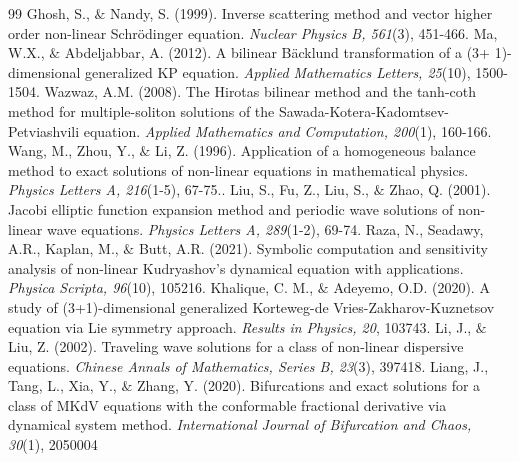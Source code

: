 \documentclass{article}
\numberwithin{equation}{section}
\begin{document}
\begin{thebibliography}{99}
 Ghosh, S., ${\&}$ Nandy, S. (1999). Inverse scattering method and vector higher order non-linear Schr\"{o}dinger equation. \emph{Nuclear Physics B, 561}(3), 451-466.
 Ma, W.X., ${\&}$ Abdeljabbar, A. (2012). A bilinear Bäcklund transformation of a (3+ 1)-dimensional generalized KP equation. \emph{Applied Mathematics Letters, 25}(10), 1500-1504.
 Wazwaz, A.M. (2008). The Hirotas bilinear method and the tanh-coth method for multiple-soliton solutions of the Sawada-Kotera-Kadomtsev-Petviashvili equation. \emph{Applied Mathematics and Computation, 200}(1), 160-166.
 Wang, M., Zhou, Y., ${\&}$ Li, Z. (1996). Application of a homogeneous balance method to exact solutions of non-linear equations in mathematical physics. \emph{Physics Letters A, 216}(1-5), 67-75..
 Liu, S., Fu, Z., Liu, S., ${\&}$ Zhao, Q. (2001). Jacobi elliptic function expansion method and periodic wave solutions of non-linear wave equations. \emph{Physics Letters A, 289}(1-2), 69-74.
 Raza, N., Seadawy, A.R., Kaplan, M., ${\&}$ Butt, A.R. (2021). Symbolic computation and sensitivity analysis of non-linear Kudryashov's dynamical equation with applications. \emph{Physica Scripta, 96}(10), 105216.
 Khalique, C. M., ${\&}$ Adeyemo, O.D. (2020). A study of (3+1)-dimensional generalized Korteweg-de Vries-Zakharov-Kuznetsov equation via Lie symmetry approach. \emph{Results in Physics, 20}, 103743.
 Li, J., ${\&}$ Liu, Z. (2002). Traveling wave solutions for a class of non-linear dispersive equations. \emph{Chinese Annals of Mathematics, Series B, 23}(3), 397418.
 Liang, J., Tang, L., Xia, Y., ${\&}$ Zhang, Y. (2020). Bifurcations and exact solutions for a class of MKdV equations with the conformable fractional derivative via dynamical system method. \emph{International Journal of Bifurcation and Chaos, 30}(1), 2050004
\end{thebibliography}
\end{document}

